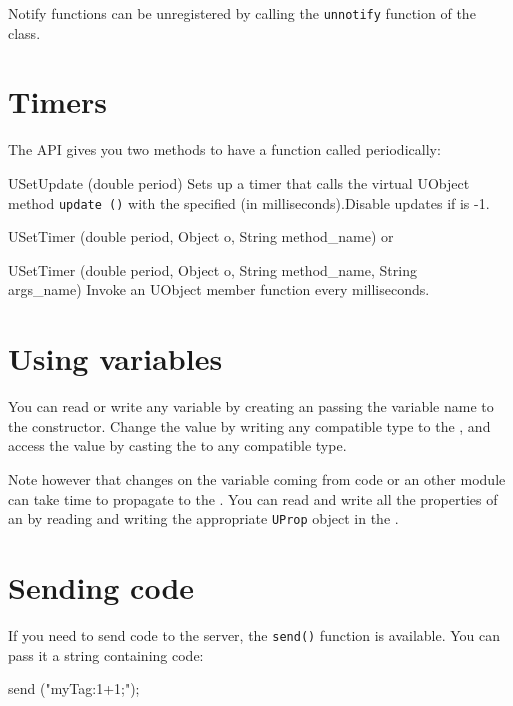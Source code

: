 Notify functions can be unregistered by calling the \lstinline|unnotify|
function of the \UVar class.

\section{Timers}
\label{sec:uob:apijava:timers}

The API gives you two methods to have a function called periodically:

\begin{cxxapi}
\item[USetUpdate (double period)] Sets up a timer that calls the virtual
  UObject method \lstinline{update ()} with the specified  (in
  milliseconds).Disable updates if  is -1.
\item[USetTimer (double period, Object o, String method\_name)] or
\item[USetTimer (double period, Object o, String method\_name, String\[\] args\_name)]
 Invoke an UObject member function  every  milliseconds.
\end{cxxapi}


\section{Using \urbi variables}
\label{sec:uob:apijava:uvar}

You can read or write any \urbi variable by creating an
\UVar passing the variable name to the constructor. Change
the value by writing any compatible type to the \UVar, and
access the value by casting the \UVar to any compatible
type.

Note however that changes on the
variable coming from \urbi code or an other module can take time to propagate
to the \UVar.
You can read and write all the \urbi properties of an \UVar by
reading and writing the appropriate \lstinline{UProp} object in the
\UVar.

\section{Sending \urbi code}
\label{sec:uob:apijava:sendcode}

If you need to send \urbi code to the server, the \lstinline{send()} function
is available. You can pass it a string containing \urbi code:

\begin{urbiunchecked}
send ("myTag:1+1;");
\end{urbiunchecked}


